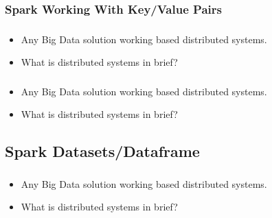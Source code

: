 \subsubsection{Spark Working With Key/Value Pairs}

\begin{frame}
  \frametitle{\subsecname}
	\begin{itemize}[<+->]
		\item Any Big Data solution working based distributed systems.
		\item What is distributed systems in brief?
	\end{itemize}
\end{frame}



\begin{frame}
  \frametitle{\subsecname}
	\begin{itemize}[<+->]
		\item Any Big Data solution working based distributed systems.
		\item What is distributed systems in brief?
	\end{itemize}
\end{frame}


\subsection{Spark Datasets/Dataframe}


\begin{frame}
  \frametitle{\subsecname}
	\begin{itemize}[<+->]
		\item Any Big Data solution working based distributed systems.
		\item What is distributed systems in brief?
	\end{itemize}
\end{frame}


